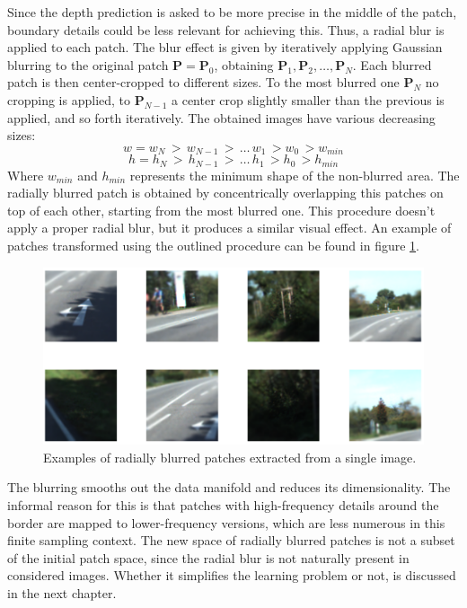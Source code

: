 Since the depth prediction is asked to be more precise in the middle of the patch, boundary details could be less relevant for achieving this.
Thus, a radial blur is applied to each patch.
The blur effect is given by iteratively applying Gaussian blurring to the original patch $\mathbf{P} = \mathbf{P}_{0}$, obtaining $\mathbf{P}_{1}, \mathbf{P}_{2}, \dotsc, \mathbf{P}_{N}$.
Each blurred patch is then center-cropped to different sizes.
To the most blurred one $\mathbf{P}_{N}$ no cropping is applied, to $\mathbf{P}_{N-1}$ a center crop slightly smaller than the previous is applied, and so forth iteratively.
The obtained images have various decreasing sizes:
\[
    w = w_{N} \, > \, w_{N-1} \, > \, \dotsc \, w_{1} \, > w_{0} \, > w_{min}
\]\[
    h = h_{N} \, > \, h_{N-1} \, > \, \dotsc \, h_{1} \, > h_{0} \, > h_{min}
\]
Where $w_{min}$ and $h_{min}$ represents the minimum shape of the non-blurred area.
The radially blurred patch is obtained by concentrically overlapping this patches on top of each other, starting from the most blurred one.
This procedure doesn't apply a proper radial blur, but it produces a similar visual effect.
An example of patches transformed using the outlined procedure can be found in figure \ref{fig:blur}.
\begin{figure}
    \centering
    \includegraphics[scale=0.4]{figs/blur}
    \caption{
        Examples of radially blurred patches extracted from a single image.
        \label{fig:blur}
    }
\end{figure}
The blurring smooths out the data manifold and reduces its dimensionality.
The informal reason for this is that patches with high-frequency details around the border are mapped to lower-frequency versions, which are less numerous in this finite sampling context.
The new space of radially blurred patches is not a subset of the initial patch space, since the radial blur is not naturally present in considered images.
Whether it simplifies the learning problem or not, is discussed in the next chapter.

